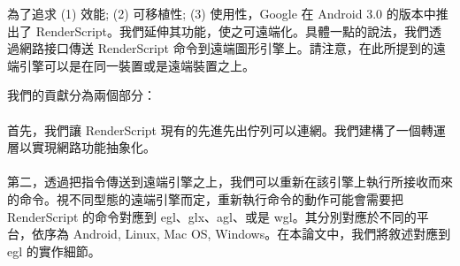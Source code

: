 \begin{abstractCH}

\setlength{\baselineskip}{1.5em}
為了追求 (1) 效能; (2) 可移植性; (3) 使用性，Google 在 Android 3.0 的版本中推出了 RenderScript。我們延伸其功能，使之可遠端化。具體一點的說法，我們透過網路接口傳送 RenderScript 命令到遠端圖形引擎上。請注意，在此所提到的遠端引擎可以是在同一裝置或是遠端裝置之上。

我們的貢獻分為兩個部分：\\
        \\首先，我們讓 RenderScript 現有的先進先出佇列可以連網。我們建構了一個轉運層以實現網路功能抽象化。\\
        \\第二，透過把指令傳送到遠端引擎之上，我們可以重新在該引擎上執行所接收而來的命令。視不同型態的遠端引擎而定，重新執行命令的動作可能會需要把 RenderScript 的命令對應到 egl、glx、agl、或是 wgl。其分別對應於不同的平台，依序為 Android, Linux, Mac OS, Windows。在本論文中，我們將敘述對應到 egl 的實作細節。

\end{abstractCH}
